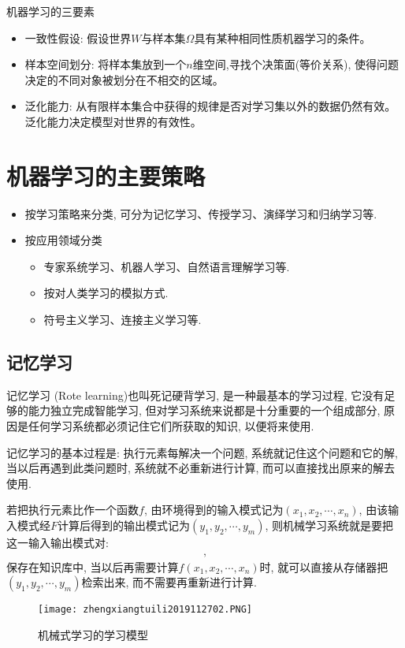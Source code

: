 机器学习的三要素
\begin{itemize}
\item 一致性假设: 假设世界$W$与样本集$\Omega$具有某种相同性质机器学习的条件。
\item 样本空间划分: 将样本集放到一个$n$维空间,寻找个决策面(等价关系), 使得问题决定的不同对象被划分在不相交的区域。
\item 泛化能力: 从有限样本集合中获得的规律是否对学习集以外的数据仍然有效。泛化能力决定模型对世界的有效性。
\end{itemize}
\section{机器学习的主要策略}
\begin{itemize}
\item 按学习策略来分类, 可分为记忆学习、传授学习、演绎学习和归纳学习等.

\item 按应用领域分类
    \begin{itemize}
      \item 专家系统学习、机器人学习、自然语言理解学习等.
      \item 按对人类学习的模拟方式.
      \item 符号主义学习、连接主义学习等.
    \end{itemize}
\end{itemize}
\subsection{记忆学习}

记忆学习 (Rote learning)也叫死记硬背学习, 是一种最基本的学习过程, 它没有足够的能力独立完成智能学习, 但对学习系统来说都是十分重要的一个组成部分, 原因是任何学习系统都必须记住它们所获取的知识, 以便将来使用.

记忆学习的基本过程是: 执行元素每解决一个问题, 系统就记住这个问题和它的解, 当以后再遇到此类问题时, 系统就不必重新进行计算, 而可以直接找出原来的解去使用.

若把执行元素比作一个函数$f$, 由环境得到的输入模式记为$ (x_1,x_2,\cdots ,x_n)$, 由该输入模式经$F$计算后得到的输出模式记为$ (y_1,y_2,\cdots ,y_m)$, 则机械学习系统就是要把这一输入输出模式对:
\begin{align}
  [ (x_1,x_2,\cdots ,x_n) , (y_1,y_2,\cdots ,y_m)],
\end{align}
保存在知识库中, 当以后再需要计算$f (x_1,x_2,\cdots ,x_n)$时, 就可以直接从存储器把$ (y_1,y_2,\cdots ,y_m)$检索出来, 而不需要再重新进行计算.
\begin{figure}[H]
\centering
\texttt{[image: zhengxiangtuili2019112702.PNG]}
\caption{机械式学习的学习模型}
\label{AI32fig2702}
\end{figure}
